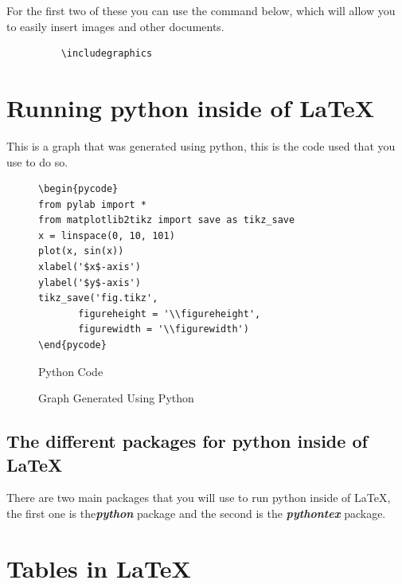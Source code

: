 \documentclass[12pt, letterpaper, oneside]{article} \usepackage[utf8]{inputenc}
\newlength\figureheight
\newlength\figurewidth
\begin{document}
For the first two of these you can use the command below, which will allow you to easily insert images and other documents.
\begin{figure}[H]
	\begin{lstlisting}
	\includegraphics
	\end{lstlisting}
\end{figure}


\section{Running python inside of \LaTeX{}}

This is a graph that was generated using python, this is the code used that you use to do so.

\begin{center}
\begin{figure}[H]
	\centering
	\begin{lstlisting}
\begin{pycode}
from pylab import *
from matplotlib2tikz import save as tikz_save
x = linspace(0, 10, 101)
plot(x, sin(x))
xlabel('$x$-axis')
ylabel('$y$-axis')
tikz_save('fig.tikz',
       figureheight = '\\figureheight',
       figurewidth = '\\figurewidth')
\end{pycode}
	\end{lstlisting}
	\caption{Python Code}
\end{figure}
\end{center}


\begin{figure}[H]
	\centering
\setlength\figureheight{3.5in}
\setlength\figurewidth{\linewidth}
	\caption{Graph Generated Using Python}
\end{figure}

\subsection{The different packages for python inside of \LaTeX{}}

There are two main packages that you will use to run python inside of \LaTeX{}, the first one is the\textbf{\emph{python}} package and the second is the \textbf{\emph{pythontex}} package. 

\pagebreak

\section{Tables in \LaTeX{}}
\end{document}
